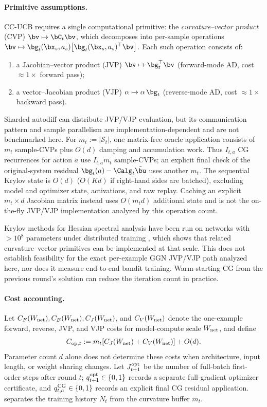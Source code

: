 \paragraph{Primitive assumptions.}
CC-UCB requires a single computational primitive: the
\emph{curvature--vector product} (CVP) $\bv\mapsto\bC_t\bv$, which
decomposes into per-sample operations
$\bv\mapsto\bg_t(\bx_s,a_s)\bigl[\bg_t(\bx_s,a_s)^\top\bv\bigr]$.
Each such operation consists of:
\begin{enumerate}[nosep,leftmargin=1.5em]
\item a Jacobian--vector product (JVP) $\bv\mapsto\bg_t^\top\bv$
  (forward-mode AD, cost $\approx 1\times$ forward pass);
\item a vector--Jacobian product (VJP) $\alpha\mapsto\alpha\,\bg_t$
  (reverse-mode AD, cost $\approx 1\times$ backward pass).
\end{enumerate}
Sharded autodiff can distribute JVP/VJP evaluation, but its communication
pattern and sample parallelism are implementation-dependent and are not
benchmarked here.
For $m_t:=|\mathcal S_t|$, one matrix-free oracle application consists of
$m_t$ sample-CVPs plus $O(d)$ damping and accumulation work.  Thus
$I_{t,a}$ CG recurrences for action $a$ use $I_{t,a}m_t$ sample-CVPs; an
explicit final check of the original-system residual
$\bg_t(a)-\Calg_t\tilde\bu$ uses another $m_t$.  The sequential Krylov state
is $O(d)$ ($O(Kd)$ if right-hand sides are batched), excluding model and
optimizer state, activations, and raw replay.  Caching an explicit
$m_t\times d$ Jacobian matrix instead uses $O(m_td)$ additional state and is
not the on-the-fly JVP/VJP implementation analyzed by this operation count.

Krylov methods for Hessian spectral analysis have been run on networks with
$>10^8$ parameters under distributed training \citep{granziol2026hessian}, which
shows that related curvature--vector primitives can be implemented at that
scale.  This does not establish feasibility for the exact per-example GGN
JVP/VJP path analyzed here, nor does it measure end-to-end bandit training.
Warm-starting CG from the previous round's solution can reduce the
iteration count in practice.

\paragraph{Cost accounting.}
Let $C_F(W_{\rm net}),C_B(W_{\rm net}),C_J(W_{\rm net})$, and
$C_V(W_{\rm net})$ denote the one-example forward, reverse, JVP, and VJP
costs for model-compute scale $W_{\rm net}$, and define
\[
 C_{{\rm op},t}:=m_t[C_J(W_{\rm net})+C_V(W_{\rm net})]+O(d).
\]
Parameter count $d$ alone does not determine these costs when architecture,
input length, or weight sharing changes.  Let $J^{\rm opt}_{t+1}$ be the number
of full-batch first-order steps after round $t$;
$q^{\rm opt}_{t+1}\in\{0,1\}$ records a separate full-gradient optimizer
certificate, and $q^{\rm CG}_{t,a}\in\{0,1\}$ records an explicit final CG
residual application.   separates the training history $N_t$
from the curvature buffer $m_t$.

